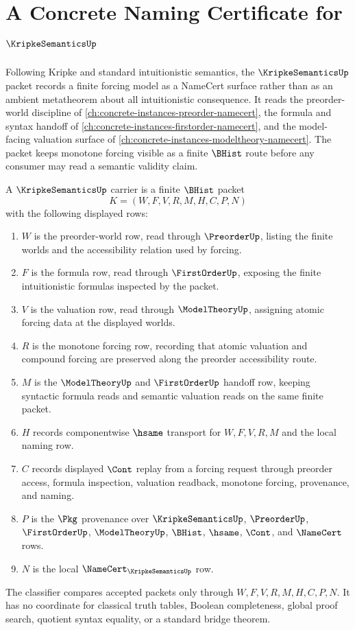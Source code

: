 \chapter{A Concrete Naming Certificate for $\KripkeSemanticsUp$}
\label{ch:concrete-instances-kripke-semantics-namecert}

Following Kripke and standard intuitionistic semantics, the $\KripkeSemanticsUp$ packet records a finite forcing model as a NameCert surface rather than as an ambient metatheorem about all intuitionistic consequence. It reads the preorder-world discipline of \autoref{ch:concrete-instances-preorder-namecert}, the formula and syntax handoff of \autoref{ch:concrete-instances-firstorder-namecert}, and the model-facing valuation surface of \autoref{ch:concrete-instances-modeltheory-namecert}. The packet keeps monotone forcing visible as a finite $\BHist$ route before any consumer may read a semantic validity claim.

\begin{definition}
\label{def:kripke-semantics-carrier}
A $\KripkeSemanticsUp$ carrier is a finite $\BHist$ packet
$$
K=(W,F,V,R,M,H,C,P,N)
$$
with the following displayed rows:
\begin{enumerate}
\item $W$ is the preorder-world row, read through $\PreorderUp$, listing the finite worlds and the accessibility relation used by forcing.
\item $F$ is the formula row, read through $\FirstOrderUp$, exposing the finite intuitionistic formulas inspected by the packet.
\item $V$ is the valuation row, read through $\ModelTheoryUp$, assigning atomic forcing data at the displayed worlds.
\item $R$ is the monotone forcing row, recording that atomic valuation and compound forcing are preserved along the preorder accessibility route.
\item $M$ is the $\ModelTheoryUp$ and $\FirstOrderUp$ handoff row, keeping syntactic formula reads and semantic valuation reads on the same finite packet.
\item $H$ records componentwise $\hsame$ transport for $W,F,V,R,M$ and the local naming row.
\item $C$ records displayed $\Cont$ replay from a forcing request through preorder access, formula inspection, valuation readback, monotone forcing, provenance, and naming.
\item $P$ is the $\Pkg$ provenance over $\KripkeSemanticsUp$, $\PreorderUp$, $\FirstOrderUp$, $\ModelTheoryUp$, $\BHist$, $\hsame$, $\Cont$, and $\NameCert$ rows.
\item $N$ is the local $\NameCert_{\KripkeSemanticsUp}$ row.
\end{enumerate}
The classifier compares accepted packets only through $W,F,V,R,M,H,C,P,N$. It has no coordinate for classical truth tables, Boolean completeness, global proof search, quotient syntax equality, or a standard bridge theorem.
\end{definition}

